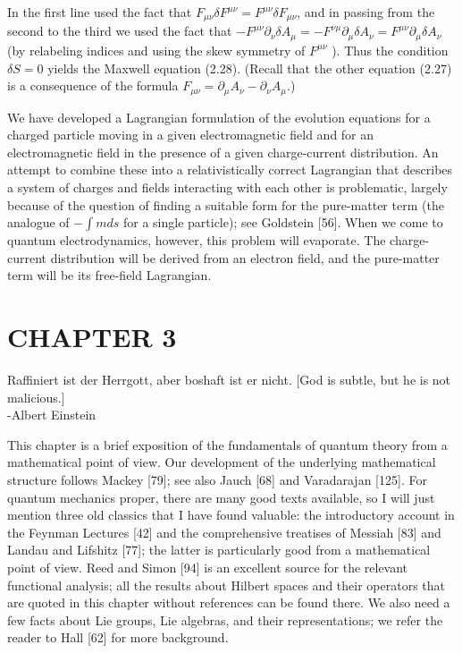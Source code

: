\documentclass[10pt, letterpaper]{article}
\begin{document}
In the first line used the fact that $F_{\mu \nu} \delta F^{\mu \nu}=F^{\mu \nu} \delta F_{\mu \nu}$, and in passing from the second to the third we used the fact that $-F^{\mu \nu} \partial_{\nu} \delta A_{\mu}=-F^{\nu \mu} \partial_{\mu} \delta A_{\nu}=F^{\mu \nu} \partial_{\mu} \delta A_{\nu}$ (by relabeling indices and using the skew symmetry of $F^{\mu \nu}$ ). Thus the condition $\delta S=0$ yields the Maxwell equation (2.28). (Recall that the other equation (2.27) is a consequence of the formula $F_{\mu \nu}=\partial_{\mu} A_{\nu}-\partial_{\nu} A_{\mu}$.)

We have developed a Lagrangian formulation of the evolution equations for a charged particle moving in a given electromagnetic field and for an electromagnetic field in the presence of a given charge-current distribution. An attempt to combine these into a relativistically correct Lagrangian that describes a system of charges and fields interacting with each other is problematic, largely because of the question of finding a suitable form for the pure-matter term (the analogue of $-\int m d s$ for a single particle); see Goldstein [56]. When we come to quantum electrodynamics, however, this problem will evaporate. The charge-current distribution will be derived from an electron field, and the pure-matter term will be its free-field Lagrangian.

\section*{CHAPTER 3}
\begin{displayquote}
Raffiniert ist der Herrgott, aber boshaft ist er nicht. [God is subtle, but he is not malicious.]\\
-Albert Einstein
\end{displayquote}

This chapter is a brief exposition of the fundamentals of quantum theory from a mathematical point of view. Our development of the underlying mathematical structure follows Mackey [79]; see also Jauch [68] and Varadarajan [125]. For quantum mechanics proper, there are many good texts available, so I will just mention three old classics that I have found valuable: the introductory account in the Feynman Lectures [42] and the comprehensive treatises of Messiah [83] and Landau and Lifshitz [77]; the latter is particularly good from a mathematical point of view. Reed and Simon [94] is an excellent source for the relevant functional analysis; all the results about Hilbert spaces and their operators that are quoted in this chapter without references can be found there. We also need a few facts about Lie groups, Lie algebras, and their representations; we refer the reader to Hall [62] for more background.
\end{document}
